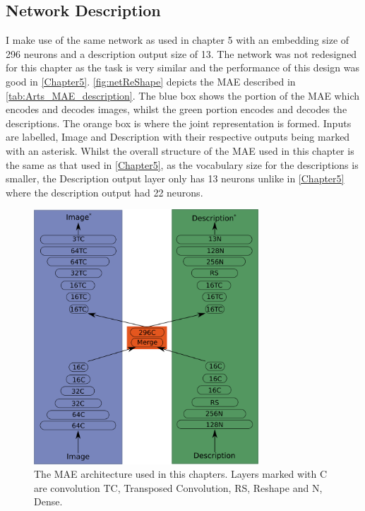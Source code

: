 \subsection{Network Description}
I make use of the same network as used in chapter 5 with an embedding size of 296 neurons and a description output size of 13. The network was not redesigned for this chapter as the task is very similar and the performance of this design was good in \autoref{Chapter5}. \autoref{fig:netReShape} depicts the \ac{MAE} described in \autoref{tab:Arts_MAE_description}. The blue box shows the portion of the \ac{MAE} which encodes and decodes images, whilst the green portion encodes and decodes the descriptions. The orange box is where the joint representation is formed. Inputs are labelled, Image and Description with their respective outputs being marked with an asterisk. Whilst the overall structure of the \ac{MAE} used in this chapter is the same as that used in \autoref{Chapter5}, as the vocabulary size for the descriptions is smaller, the Description output layer only has 13 neurons unlike in \autoref{Chapter5} where the description output had 22 neurons.

\begin{figure}
\centering
\includegraphics[width=0.75\textwidth]{Figs/chapter6/maeArch.png}
\caption{The \ac{MAE} architecture used in this chapters. Layers marked with C are convolution TC, Transposed Convolution, RS, Reshape and N, Dense.}
\label{fig:netReShape}
\end{figure}



